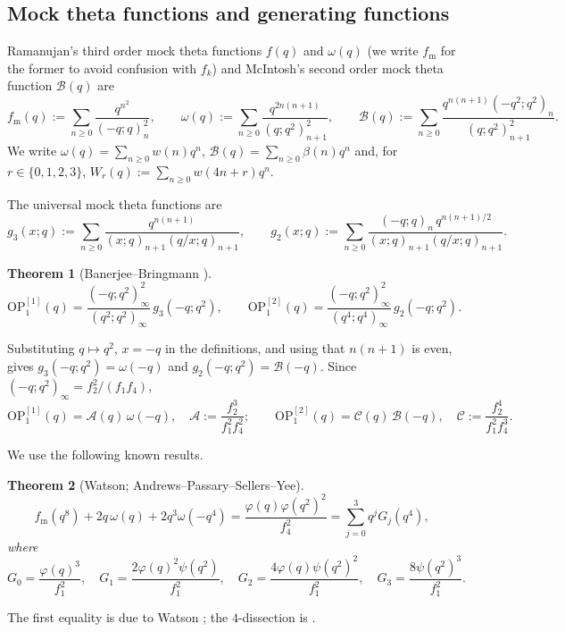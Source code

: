\documentclass[11pt]{amsart}
\newtheorem{theorem}{Theorem}[section]
\theoremstyle{definition}
\theoremstyle{remark}
\numberwithin{equation}{section}
\newcommand{\OP}{\mathrm{OP}}
\begin{document}
\subsection{Mock theta functions and generating functions}
Ramanujan's third order mock theta functions $f(q)$ and $\omega(q)$ (we write $f_{\mathrm{m}}$ for the former to avoid confusion with $f_k$) and McIntosh's second order mock theta function $\mathcal B(q)$ are
\begin{equation}\label{eq:Bdef}
f_{\mathrm m}(q):=\sum_{n\ge0}\frac{q^{n^2}}{(-q;q)_n^2},\qquad
\omega(q):=\sum_{n\ge0}\frac{q^{2n(n+1)}}{(q;q^2)_{n+1}^2},\qquad
\mathcal B(q):=\sum_{n\ge0}\frac{q^{n(n+1)}(-q^2;q^2)_n}{(q;q^2)_{n+1}^2}.
\end{equation}
We write $\omega(q)=\sum_{n\ge0}w(n)q^n$, $\mathcal B(q)=\sum_{n\ge0}\beta(n)q^n$ and, for $r\in\{0,1,2,3\}$, $W_r(q):=\sum_{n\ge0}w(4n+r)q^n$.

The universal mock theta functions are
\[
g_3(x;q):=\sum_{n\ge0}\frac{q^{n(n+1)}}{(x;q)_{n+1}(q/x;q)_{n+1}},\qquad
g_2(x;q):=\sum_{n\ge0}\frac{(-q;q)_n\,q^{n(n+1)/2}}{(x;q)_{n+1}(q/x;q)_{n+1}} .
\]

\begin{theorem}[{Banerjee--Bringmann \cite[Thms.~1.2, 1.4]{BB}}]\label{thm:BB}
\[
\OP_1^{[1]}(q)=\frac{(-q;q^2)_\infty^2}{(q^2;q^2)_\infty}\,g_3(-q;q^2),\qquad
\OP_1^{[2]}(q)=\frac{(-q;q^2)_\infty^2}{(q^4;q^4)_\infty}\,g_2(-q;q^2).
\]
\end{theorem}

Substituting $q\mapsto q^2$, $x=-q$ in the definitions, and using that $n(n+1)$ is even, gives $g_3(-q;q^2)=\omega(-q)$ and $g_2(-q;q^2)=\mathcal B(-q)$. Since $(-q;q^2)_\infty=f_2^2/(f_1f_4)$,
\begin{equation}\label{eq:OPs}
\OP_1^{[1]}(q)=\mathcal A(q)\,\omega(-q),\quad \mathcal A:=\frac{f_2^3}{f_1^2f_4^2};\qquad
\OP_1^{[2]}(q)=\mathcal C(q)\,\mathcal B(-q),\quad \mathcal C:=\frac{f_2^4}{f_1^2f_4^3}.
\end{equation}

We use the following known results.

\begin{theorem}[Watson; Andrews--Passary--Sellers--Yee]\label{thm:APSY}
\[
f_{\mathrm m}(q^8)+2q\,\omega(q)+2q^3\omega(-q^4)=\frac{\varphi(q)\varphi(q^2)^2}{f_4^2}=\sum_{j=0}^{3}q^jG_j(q^4),
\]
where
\[
G_0=\frac{\varphi(q)^3}{f_1^2},\quad G_1=\frac{2\varphi(q)^2\psi(q^2)}{f_1^2},\quad G_2=\frac{4\varphi(q)\psi(q^2)^2}{f_1^2},\quad G_3=\frac{8\psi(q^2)^3}{f_1^2}.
\]
\end{theorem}
The first equality is due to Watson \cite[p.~63]{Wat}; the $4$-dissection is \cite[Lemma~3.1]{APSY}.
\end{document}
